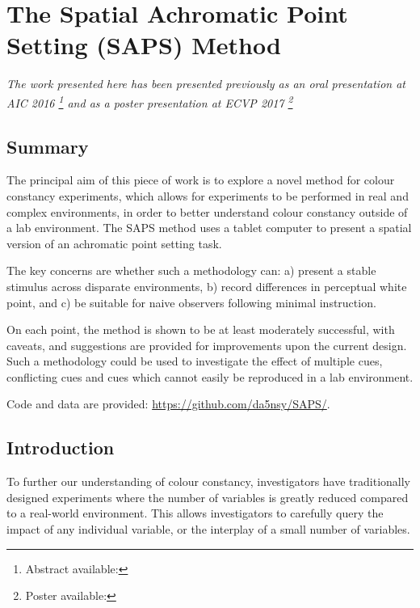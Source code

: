 \chapter{The Spatial Achromatic Point Setting (SAPS) Method}
\label{TabletMethodChapter}

\textit{The work presented here has been presented previously as an oral presentation at AIC 2016 \citep[p. 125]{garside_estimating_2016}\footnote{Abstract available: } and as a poster presentation at ECVP 2017 \citep[p. 93]{niko_busch_european_2017}\footnote{Poster available: }}

\section{Summary}

The principal aim of this piece of work is to explore a novel method for colour constancy experiments, which allows for experiments to be performed in real and complex environments, in order to better understand colour constancy outside of a lab environment. The \gls{SAPS} method uses a tablet computer to present a spatial version of an achromatic point setting task. 

The key concerns are whether such a methodology can: a) present a stable stimulus across disparate environments, b) record differences in perceptual white point, and c) be suitable for naive observers following minimal instruction. 

On each point, the method is shown to be at least moderately successful, with caveats, and suggestions are provided for improvements upon the current design. Such a methodology could be used to investigate the effect of multiple cues, conflicting cues and cues which cannot easily be reproduced in a lab environment.

Code and data are provided: \url{https://github.com/da5nsy/SAPS/}.

\newpage

\section{Introduction}

To further our understanding of colour constancy, investigators have traditionally designed experiments where the number of variables is greatly reduced compared to a real-world environment. This allows investigators to carefully query the impact of any individual variable, or the interplay of a small number of variables. 

